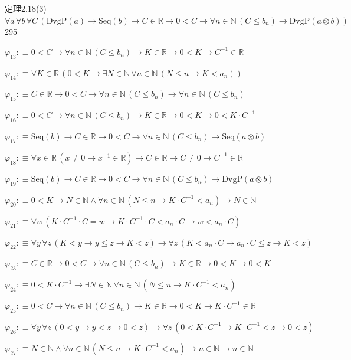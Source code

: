 \begin{fullproof}{定理2.18(3)}{$\forall a\,\forall b\,\forall C\,(\mathrm{DvgP}(a) \to \mathrm{Seq}(b) \to C \in \mathbb{R} \to 0 < C \to \forall n \in \mathbb{N}\,(C \leq b_{n}) \to \mathrm{DvgP}(a \otimes b))$}{295}
\begin{abbrevlist}
\item $\varphi_{13} :\equiv 0 < C \to \forall n \in \mathbb{N}\,(C \leq b_{n}) \to K \in \mathbb{R} \to 0 < K \to C^{-1} \in \mathbb{R}$
\item $\varphi_{14} :\equiv \forall K \in \mathbb{R}\,(0 < K \to \exists N \in \mathbb{N}\,\forall n \in \mathbb{N}\,(N \leq n \to K < a_{n}))$
\item $\varphi_{15} :\equiv C \in \mathbb{R} \to 0 < C \to \forall n \in \mathbb{N}\,(C \leq b_{n}) \to \forall n \in \mathbb{N}\,(C \leq b_{n})$
\item $\varphi_{16} :\equiv 0 < C \to \forall n \in \mathbb{N}\,(C \leq b_{n}) \to K \in \mathbb{R} \to 0 < K \to 0 < K \cdot C^{-1}$
\item $\varphi_{17} :\equiv \mathrm{Seq}(b) \to C \in \mathbb{R} \to 0 < C \to \forall n \in \mathbb{N}\,(C \leq b_{n}) \to \mathrm{Seq}(a \otimes b)$
\item $\varphi_{18} :\equiv \forall x \in \mathbb{R}\,(x \neq 0 \to x^{-1} \in \mathbb{R}) \to C \in \mathbb{R} \to C \neq 0 \to C^{-1} \in \mathbb{R}$
\item $\varphi_{19} :\equiv \mathrm{Seq}(b) \to C \in \mathbb{R} \to 0 < C \to \forall n \in \mathbb{N}\,(C \leq b_{n}) \to \mathrm{DvgP}(a \otimes b)$
\item $\varphi_{20} :\equiv 0 < K \to N \in \mathbb{N} \land \forall n \in \mathbb{N}\,(N \leq n \to K \cdot C^{-1} < a_{n}) \to N \in \mathbb{N}$
\item $\varphi_{21} :\equiv \forall w\,(K \cdot C^{-1} \cdot C = w \to K \cdot C^{-1} \cdot C < a_{n} \cdot C \to w < a_{n} \cdot C)$
\item $\varphi_{22} :\equiv \forall y\,\forall z\,(K < y \to y \leq z \to K < z) \to \forall z\,(K < a_{n} \cdot C \to a_{n} \cdot C \leq z \to K < z)$
\item $\varphi_{23} :\equiv C \in \mathbb{R} \to 0 < C \to \forall n \in \mathbb{N}\,(C \leq b_{n}) \to K \in \mathbb{R} \to 0 < K \to 0 < K$
\item $\varphi_{24} :\equiv 0 < K \cdot C^{-1} \to \exists N \in \mathbb{N}\,\forall n \in \mathbb{N}\,(N \leq n \to K \cdot C^{-1} < a_{n})$
\item $\varphi_{25} :\equiv 0 < C \to \forall n \in \mathbb{N}\,(C \leq b_{n}) \to K \in \mathbb{R} \to 0 < K \to K \cdot C^{-1} \in \mathbb{R}$
\item $\varphi_{26} :\equiv \forall y\,\forall z\,(0 < y \to y < z \to 0 < z) \to \forall z\,(0 < K \cdot C^{-1} \to K \cdot C^{-1} < z \to 0 < z)$
\item $\varphi_{27} :\equiv N \in \mathbb{N} \land \forall n \in \mathbb{N}\,(N \leq n \to K \cdot C^{-1} < a_{n}) \to n \in \mathbb{N} \to n \in \mathbb{N}$

\end{abbrevlist}
\end{fullproof}
